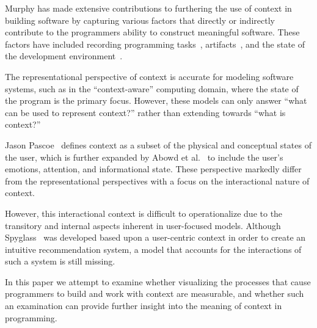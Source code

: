Murphy has made extensive contributions to furthering the use of context in building software by capturing various factors that directly or indirectly contribute to the programmers ability to construct meaningful software. These factors have included recording programming tasks~\cite{Kersten:2006}, artifacts~\cite{Vcubranic:2003}, and the state of the development environment~\cite{Gasparic:2017}.


The representational perspective of context is accurate for modeling software systems, such as in the ``context-aware'' computing domain, where the state of the program is the primary focus. However, these models can only answer ``what can be used to represent context?'' rather than extending towards ``what is context?''


Jason Pascoe~\citep{Pascoe:1998} defines context as a subset of the physical and conceptual states of the user, which is further expanded by Abowd et al.~\cite{Abowd:1999} to include the user's emotions, attention, and informational state. These perspective markedly differ from the representational perspectives with a focus on the interactional nature of context.


However, this interactional context is difficult to operationalize due to the transitory and internal aspects inherent in user-focused models. Although Spyglass~\cite{Viriyakattiyaporn:2010} was developed based upon a user-centric context in order to create an intuitive recommendation system, a model that accounts for the interactions of such a system is still missing.


In this paper we attempt to examine whether visualizing the processes that cause programmers to build and work with context are measurable, and whether such an examination can provide further insight into the meaning of context in programming. 